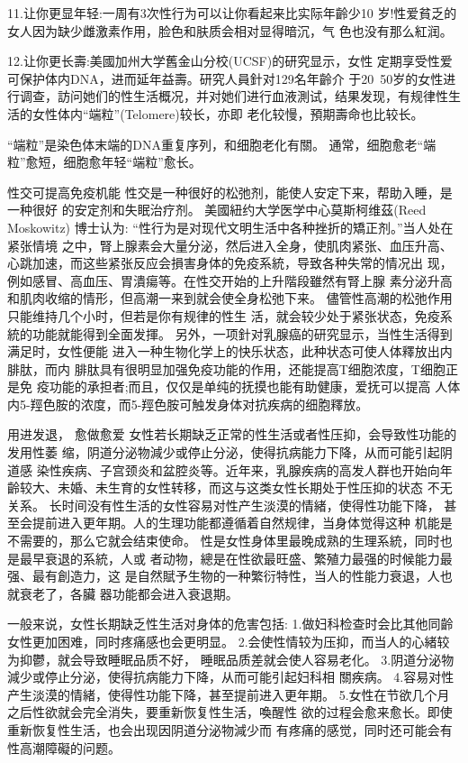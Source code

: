 \documentclass[12pt,UTF8]{ctexbook}
\begin{document}
11.让你更显年轻:一周有3次性行为可以让你看起来比实际年齡少10
岁!性爱貧乏的女人因为缺少雌激素作用，脸色和肤质会相对显得暗沉，气
色也没有那么紅润。

12.让你更长壽:美國加州大学舊金山分校(UCSF)的研究显示，女性
定期享受性爱可保护体内DNA，进而延年益壽。研究人員針对129名年齡介
于20~50岁的女性进行调查，訪问她们的性生活概况，并对她们进行血液測试，结果发现，有规律性生活的女性体内“端粒”(Telomere)较长，亦即
老化较慢，預期壽命也比较长。

“端粒”是染色体末端的DNA重复序列，和细胞老化有關。
通常，细胞愈老“端粒”愈短，细胞愈年轻“端粒”愈长。

性交可提高免疫机能
性交是一种很好的松弛剂，能使人安定下来，帮助入睡，是一种很好
的安定剂和失眠治疗剂。
美國紐约大学医学中心莫斯柯维茲(Reed Moskowitz) 博士认为:
“性行为是对现代文明生活中各种挫折的矯正剂。”当人处在紧张情境
之中，腎上腺素会大量分泌，然后进入全身，使肌肉紧张、血压升高、心跳加速，而这些紧张反应会損害身体的免疫系統，导致各种失常的情况出
现，例如感冒、高血压、胃潰瘍等。在性交开始的上升階段雖然有腎上腺
素分泌升高和肌肉收缩的情形，但高潮一来到就会使全身松弛下来。
儘管性高潮的松弛作用只能维持几个小时，但若是你有规律的性生
活，就会较少处于紧张状态，免疫系統的功能就能得到全面发揮。
另外，一项針对乳腺癌的研究显示，当性生活得到满足时，女性便能
进入一种生物化学上的快乐状态，此种状态可使人体釋放出内腓肽，而内
腓肽具有很明显加强免疫功能的作用，还能提高T细胞浓度，T细胞正是免
疫功能的承担者;而且，仅仅是单纯的抚摸也能有助健康，爱抚可以提高
人体内5-羥色胺的浓度，而5-羥色胺可触发身体对抗疾病的细胞釋放。

用进发退，
愈做愈爱
女性若长期缺乏正常的性生活或者性压抑，会导致性功能的发用性萎
缩，阴道分泌物減少或停止分泌，使得抗病能力下降，从而可能引起阴道感
染性疾病、子宫颈炎和盆腔炎等。近年来，乳腺疾病的高发人群也开始向年
齡较大、未婚、未生育的女性转移，而这与这类女性长期处于性压抑的状态
不无关系。
长时间没有性生活的女性容易对性产生淡漠的情緒，使得性功能下降，
甚至会提前进入更年期。人的生理功能都遵循着自然规律，当身体觉得这种
机能是不需要的，那么它就会结束使命。
性是女性身体里最晚成熟的生理系統，同时也是最早衰退的系統，人或
者动物，總是在性欲最旺盛、繁殖力最强的时候能力最强、最有創造力，这
是自然賦予生物的一种繁衍特性，当人的性能力衰退，人也就衰老了，各臟
器功能都会进入衰退期。

一般来说，女性长期缺乏性生活对身体的危害包括:
1.做妇科检查时会比其他同齡女性更加困难，同时疼痛感也会更明显。
2.会使性情较为压抑，而当人的心緒较为抑鬱，就会导致睡眠品质不好，
睡眠品质差就会使人容易老化。
3.阴道分泌物減少或停止分泌，使得抗病能力下降，从而可能引起妇科相
關疾病。
4.容易对性产生淡漠的情緒，使得性功能下降，甚至提前进入更年期。
5.女性在节欲几个月之后性欲就会完全消失，要重新恢复性生活，喚醒性
欲的过程会愈来愈长。即使重新恢复性生活，也会出现因阴道分泌物減少而
有疼痛的感觉，同时还可能会有性高潮障礙的问题。
\end{document}
